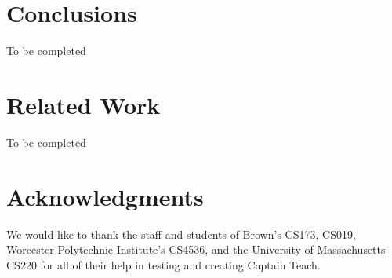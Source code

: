 \documentclass{sig-alternate}
\begin{document}
\section{Conclusions}
To be completed


\section{Related Work}
To be completed


\section{Acknowledgments}
We would like to thank the staff and students of Brown's CS173, CS019, 
Worcester Polytechnic Institute's CS4536, and the University of Massachusetts
CS220 for all of their help in testing and creating Captain Teach.



%

%
%
\end{document}
